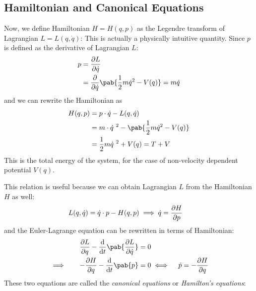 \subsection{Hamiltonian and Canonical Equations}
Now, we define Hamiltonian $H = H(q, p)$ as the Legendre transform of Lagrangian $L = L(q, \dot{q})$:
This is actually a physically intuitive quantity. Since $p$ is defined as the derivative of Lagrangian $L$:
\begin{align}
  p & = \pdv{L}{\dot{q}}                                                 \\
    & = \pdv{}{\dot{q}} \pab{\frac{1}{2} m \dot{q}^2 - V(q)} = m \dot{q}
\end{align}
and we can rewrite the Hamiltonian as
\begin{align}
  H(q, p) & = p \cdot \dot{q} - L(q, \dot{q})                              \\
          & = m \cdot \dot{q}^{\ 2} - \pab{\frac{1}{2} m \dot{q}^2 - V(q)} \\
          & = \frac{1}{2} m \dot{q}^{\ 2} + V(q) = T + V
\end{align}
This is the total energy of the system, for the case of non-velocity dependent potential $V(q)$.

This relation is useful because we can obtain Lagrangian $L$ from the Hamiltonian $H$ as well:
\begin{align}
  L(q, \dot{q}) & = \dot{q} \cdot p - H(q, p) \implies \dot{q} = \pdv{H}{p}
\end{align}
and the Euler-Lagrange equation can be rewritten in terms of Hamiltonian:
\begin{alignat}{2}
   &          & \pdv{L}{q} - \odv{}{t} \pab{\pdv{L}{\dot{q}}} & = 0 \\
   & \implies & \quad -\pdv{H}{q} - \odv{}{t} \pab{p}         & = 0
  \iff \quad \dot{p} = - \pdv{H}{q}
\end{alignat}
These two equations are called the \emph{canonical equations} or \emph{Hamilton's equations}:

